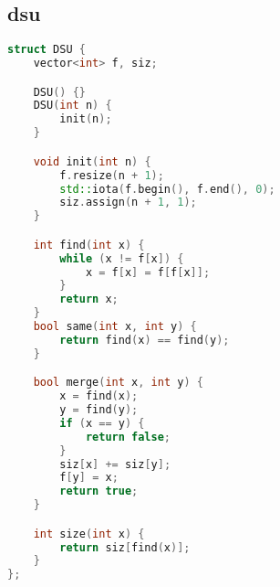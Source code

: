 \subsection{dsu}
\begin{lstlisting}[language=C++]
struct DSU {
    vector<int> f, siz;

    DSU() {}
    DSU(int n) {
        init(n);
    }

    void init(int n) {
        f.resize(n + 1);
        std::iota(f.begin(), f.end(), 0);
        siz.assign(n + 1, 1);
    }

    int find(int x) {
        while (x != f[x]) {
            x = f[x] = f[f[x]];
        }
        return x;
    }
    bool same(int x, int y) {
        return find(x) == find(y);
    }

    bool merge(int x, int y) {
        x = find(x);
        y = find(y);
        if (x == y) {
            return false;
        }
        siz[x] += siz[y];
        f[y] = x;
        return true;
    }

    int size(int x) {
        return siz[find(x)];
    }
};

\end{lstlisting}
